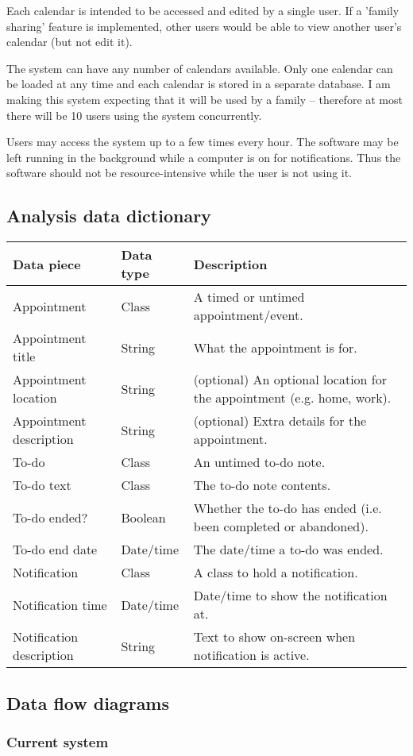 Each calendar is intended to be accessed and edited by a single user. If a
'family sharing' feature is implemented, other users would be able to view
another user's calendar (but not edit it).

The system can have any number of calendars available. Only one calendar can be
loaded at any time and each calendar is stored in a separate database. I am
making this system expecting that it will be used by a family -- therefore at
most there will be 10 users using the system concurrently.

Users may access the system up to a few times every hour. The software may be
left running in the background while a computer is on for notifications. Thus
the software should not be resource-intensive while the user is not using it.


\subsection{Analysis data dictionary}

\newcommand{\dictline}[1]{#1 \\ \hline}

\begin{tabulary}{\linewidth}{|L|L|L|} \hline
  \textbf{Data piece} & \textbf{Data type} & \textbf{Description} \\ \hline
  \dictline{Appointment & Class & A timed or untimed appointment/event.}
  \dictline{Appointment title & String & What the appointment is for.}
  \dictline{Appointment location & String & (optional) An optional location for the appointment (e.g. home, work).}
  \dictline{Appointment description & String & (optional) Extra details for the appointment.}
  \dictline{To-do & Class & An untimed to-do note.}
  \dictline{To-do text & Class & The to-do note contents.}
  \dictline{To-do ended? & Boolean & Whether the to-do has ended (i.e. been completed or abandoned).}
  \dictline{To-do end date & Date/time & The date/time a to-do was ended.}
  \dictline{Notification & Class & A class to hold a notification.}
  \dictline{Notification time & Date/time & Date/time to show the notification at.}
  \dictline{Notification description & String & Text to show on-screen when notification is active.}
\end{tabulary}

\subsection{Data flow diagrams}
\subsubsection{Current system}

